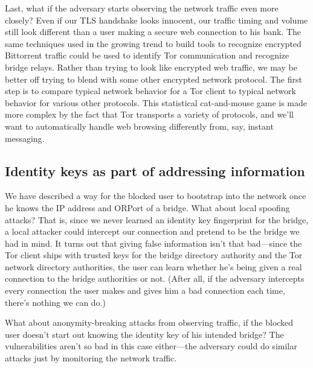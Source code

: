 \documentclass{llncs}
\begin{document}
Last, what if the adversary starts observing the network traffic even
more closely? Even if our TLS handshake looks innocent, our traffic timing
and volume still look different than a user making a secure web connection
to his bank. The same techniques used in the growing trend to build tools
to recognize encrypted Bittorrent traffic
could be used to identify Tor communication and recognize bridge
relays. Rather than trying to look like encrypted web traffic, we may be
better off trying to blend with some other encrypted network protocol. The
first step is to compare typical network behavior for a Tor client to
typical network behavior for various other protocols. This statistical
cat-and-mouse game is made more complex by the fact that Tor transports a
variety of protocols, and we'll want to automatically handle web browsing
differently from, say, instant messaging.


\subsection{Identity keys as part of addressing information}
\label{subsec:id-address}

We have described a way for the blocked user to bootstrap into the
network once he knows the IP address and ORPort of a bridge. What about
local spoofing attacks? That is, since we never learned an identity
key fingerprint for the bridge, a local attacker could intercept our
connection and pretend to be the bridge we had in mind. It turns out
that giving false information isn't that bad---since the Tor client
ships with trusted keys for the bridge directory authority and the Tor
network directory authorities, the user can learn whether he's being
given a real connection to the bridge authorities or not. (After all,
if the adversary intercepts every connection the user makes and gives
him a bad connection each time, there's nothing we can do.)

What about anonymity-breaking attacks from observing traffic, if the
blocked user doesn't start out knowing the identity key of his intended
bridge? The vulnerabilities aren't so bad in this case either---the
adversary could do similar attacks just by monitoring the network
traffic.
\end{document}
